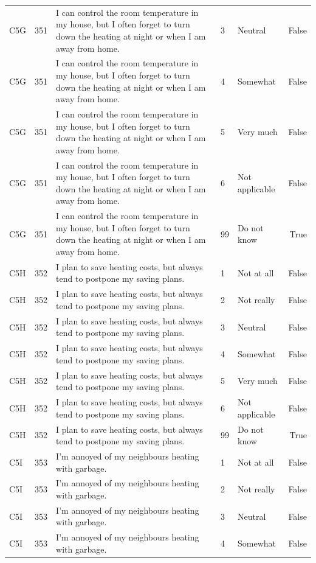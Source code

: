 \begin{tabular}{lrlllr}
C5G & 351 & I can control the room temperature in my house, but I often forget to turn down the heating at night or when I am away from home. & 3 & Neutral & False \\
C5G & 351 & I can control the room temperature in my house, but I often forget to turn down the heating at night or when I am away from home. & 4 & Somewhat & False \\
C5G & 351 & I can control the room temperature in my house, but I often forget to turn down the heating at night or when I am away from home. & 5 & Very much & False \\
C5G & 351 & I can control the room temperature in my house, but I often forget to turn down the heating at night or when I am away from home. & 6 & Not applicable & False \\
C5G & 351 & I can control the room temperature in my house, but I often forget to turn down the heating at night or when I am away from home. & 99 & Do not know & True \\
C5H & 352 & I plan to save heating costs, but always tend to postpone my saving plans. & 1 & Not at all & False \\
C5H & 352 & I plan to save heating costs, but always tend to postpone my saving plans. & 2 & Not really & False \\
C5H & 352 & I plan to save heating costs, but always tend to postpone my saving plans. & 3 & Neutral & False \\
C5H & 352 & I plan to save heating costs, but always tend to postpone my saving plans. & 4 & Somewhat & False \\
C5H & 352 & I plan to save heating costs, but always tend to postpone my saving plans. & 5 & Very much & False \\
C5H & 352 & I plan to save heating costs, but always tend to postpone my saving plans. & 6 & Not applicable & False \\
C5H & 352 & I plan to save heating costs, but always tend to postpone my saving plans. & 99 & Do not know & True \\
C5I & 353 & I’m annoyed of my neighbours heating with garbage. & 1 & Not at all & False \\
C5I & 353 & I’m annoyed of my neighbours heating with garbage. & 2 & Not really & False \\
C5I & 353 & I’m annoyed of my neighbours heating with garbage. & 3 & Neutral & False \\
C5I & 353 & I’m annoyed of my neighbours heating with garbage. & 4 & Somewhat & False \\

\end{tabular}
